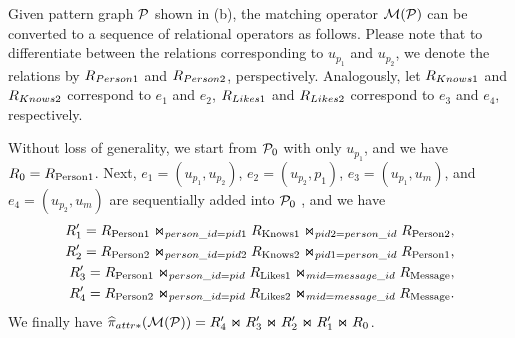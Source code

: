 \begin{example}
    Given pattern graph $\mathcal{P}$ shown in (b), the matching operator $\mathcal{M}(\mathcal{P})$ can be converted to a sequence of relational operators as follows.
    Please note that to differentiate between the relations corresponding to $u_{p_1}$ and $u_{p_2}$, we denote the relations by ${R_{Person1}}$ and ${R_{Person2}}$, perspectively.
    Analogously, let ${R_{Knows1}}$ and ${R_{Knows2}}$ correspond to $e_1$ and $e_2$, ${R_{Likes1}}$ and ${R_{Likes2}}$ correspond to $e_3$ and $e_4$, respectively.

    Without loss of generality, we start from $\mathcal{P}_0$ with only $u_{p_1}$, and we have ${R_{0}} = {R_{\text{Person1}}}$. 
    Next, $e_1 = (u_{p_1}, u_{p_2})$, $e_2 = (u_{p_2}, p_1)$, $e_3 = (u_{p_1}, u_m)$, and $e_4 = (u_{p_2}, u_m)$ are sequentially added into $\mathcal{P}_0$ , and we have
    \begin{equation*}
      \begin{split}
        R'_1 = {R_{\text{Person1}}} \Join_{person\_id=pid1} {R_{\text{Knows1}}} \Join_{pid2=person\_id} {R_{\text{Person2}}}, \\
        R'_2 = {R_{\text{Person2}}} \Join_{person\_id=pid2} {R_{\text{Knows2}}} \Join_{pid1=person\_id} {R_{\text{Person1}}}, \\
        R'_3 = {R_{\text{Person1}}} \Join_{person\_id=pid} {R_{\text{Likes1}}} \Join_{mid=message\_id} {R_{\text{Message}}}, \\
        R'_4 = {R_{\text{Person2}}} \Join_{person\_id=pid} {R_{\text{Likes2}}} \Join_{mid=message\_id} {R_{\text{Message}}}.
      \end{split}
    \end{equation*}
    We finally have $\widehat{\pi}_{attr*}(\mathcal{M}(\mathcal{P})) = R'_4 \Join R'_3 \Join R'_2 \Join R'_1 \Join R_0$.


\end{example}

